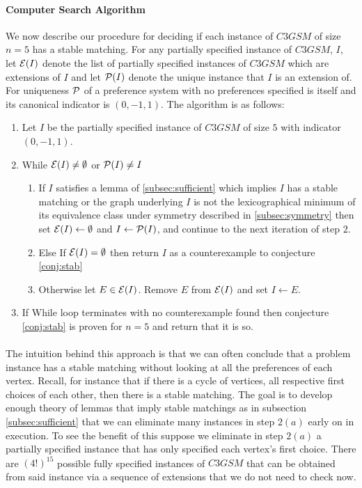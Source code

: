 \paragraph{Computer Search Algorithm}
We now describe our procedure for deciding if each instance of $C3GSM$ of size $n=5$ has a stable matching. For any partially specified instance of $C3GSM$, $I$, let $\mathcal{E}(I)$ denote the list of partially specified instances of $C3GSM$ which are extensions of $I$ and let $\mathcal{P}(I)$ denote the unique instance that $I$ is an extension of. For uniqueness $\mathcal{P}$ of a preference system with no preferences specified is itself and its canonical indicator is $(0,-1,1)$. The algorithm is as follows:
\begin{enumerate}
\item Let $I$ be the partially specified instance of $C3GSM$ of size $5$ with indicator $(0,-1,1)$.
\item While $\mathcal{E}(I) \neq \emptyset$ or $\mathcal{P}(I) \neq I$
	\begin{enumerate}
	\item If $I$ satisfies a lemma of \ref{subsec:sufficient} which implies $I$ has a stable matching or the graph underlying $I$ is not the lexicographical minimum of its equivalence class under symmetry described in \ref{subsec:symmetry} then set $\mathcal{E}(I) \leftarrow \emptyset$ and $I \leftarrow \mathcal{P}(I)$, and continue to the next iteration of step $2$.
	\item Else If $\mathcal{E}(I) = \emptyset$ then return $I$ as a counterexample to conjecture \ref{conj:stab}
	\item Otherwise let $E \in \mathcal{E}(I)$. Remove $E$ from $\mathcal{E}(I)$ and set $I \leftarrow E$. 
	\end{enumerate}
\item If While loop terminates with no counterexample found then conjecture \ref{conj:stab} is proven for $n=5$ and return that it is so.
\end{enumerate}
\paragraph{}
The intuition behind this approach is that we can often conclude that a problem instance has a stable matching without looking at all the preferences of each vertex. Recall, for instance that if there is a cycle of vertices, all respective first choices of each other, then there is a stable matching. The goal is to develop enough theory of lemmas that imply stable matchings as in subsection \ref{subsec:sufficient} that we can eliminate many instances in step $2(a)$ early on in execution. To see the benefit of this suppose we eliminate in step $2(a)$ a partially specified instance that has only specified each vertex's first choice. There are $(4!)^{15}$ possible fully specified instances of $C3GSM$ that can be obtained from said instance via a sequence of extensions that we do not need to check now.
